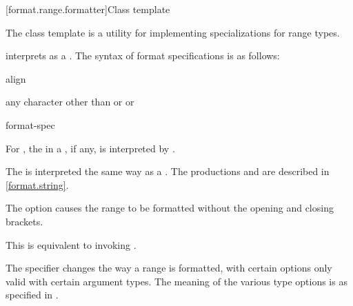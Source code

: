[format.range.formatter]{Class template }

\pnum
The class template  is a utility
for implementing  specializations for range types.

\pnum
{} interprets 
as a .
The syntax of format specifications is as follows:

\begin{ncbnf}
\br
        
\end{ncbnf}

\begin{ncbnf}
\br
     align
\end{ncbnf}

\begin{ncbnf}
\br
    \textnormal{any character other than} \terminal{\{} \textnormal{or} \terminal{\}} \textnormal{or} \terminal{:}
\end{ncbnf}

\begin{ncbnf}
\br
    \br
    \br
\end{ncbnf}

\begin{ncbnf}
\br
    \terminal{:} format-spec
\end{ncbnf}

\pnum
For ,
the 
in a , if any,
is interpreted by .

\pnum
The  is interpreted
the same way as a .
The productions  and 
are described in \ref{format.string}.

\pnum
The  option causes the range to be formatted
without the opening and closing brackets.
\begin{note}
This is equivalent to invoking .
\end{note}

\pnum
The  specifier changes the way a range is formatted,
with certain options only valid with certain argument types.
The meaning of the various type options
is as specified in .

